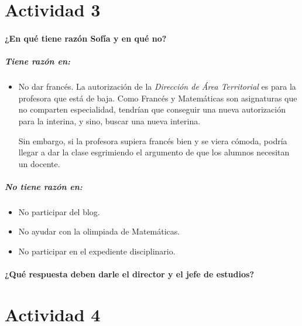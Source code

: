 \section{Actividad 3}


\paragraph{¿En qué tiene razón Sofía y en qué no?}

\subparagraph{Tiene razón en:}

\begin{itemize}
	\item No dar francés. La autorización de la \textit{Dirección de Área Territorial} es para la profesora que está de baja. 
	Como Francés y Matemáticas son asignaturas que no comparten especialidad, tendrían que conseguir una nueva autorización para la interina, y sino, buscar una nueva interina.

	Sin embargo, si la profesora supiera francés bien y se viera cómoda, podría llegar a dar la clase esgrimiendo el argumento de que los alumnos necesitan un docente.
\end{itemize}


\subparagraph{No tiene razón en:}

\begin{itemize}
	\item No participar del blog.
	\item No ayudar con la olimpiada de Matemáticas.
	\item No participar en el expediente disciplinario.
\end{itemize}


\paragraph{¿Qué respuesta deben darle el director y el jefe de estudios?}



\section{Actividad 4}


